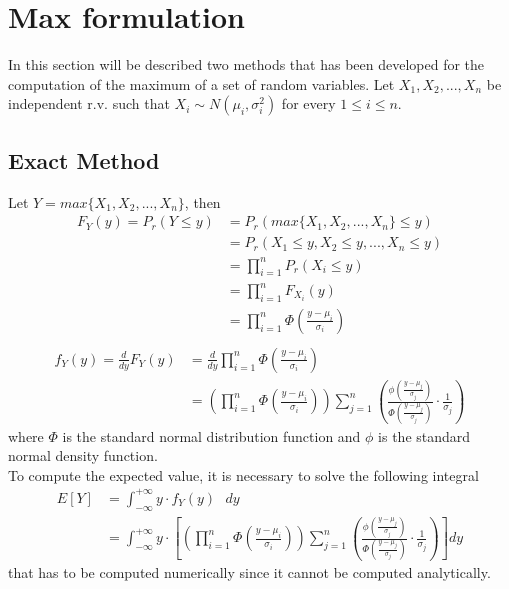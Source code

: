 \section{Max formulation}

In this section will be described two methods that has been developed for the computation of the maximum of a set of random variables.
Let $X_1, X_2, ..., X_n$ be independent r.v. such that $X_i \sim N(\mu_i, \sigma_i^2)$ for every $1 \leq i \leq n.$

\subsection{Exact Method}
Let $Y = max\{X_1, X_2, ..., X_n\}$, then
\begin{align*}
	F_Y(y) = P_r(Y \leq y) &= P_r(max\{X_1, X_2, ..., X_n\} \leq y) \\
	&= P_r(X_1 \leq y, X_2 \leq y, ..., X_n \leq y) \\
	&= \prod_{i = 1}^n P_r(X_i \leq y)  \tag*{(by indipendence of r.v)} \\
	&= \prod_{i = 1}^n F_{X_i}(y)  \\
	&= \prod_{i = 1}^n \Phi\left(\frac{y - \mu_i}{\sigma_i}\right) \\
\end{align*}
\begin{align*}
	f_Y(y) = \frac{d}{dy} F_Y(y) &= \frac{d}{dy} \prod_{i = 1}^n \Phi\left(\frac{y - \mu_i}{\sigma_i}\right) \\
	&= \left(\prod_{i = 1}^n \Phi\left(\frac{y - \mu_i}{\sigma_i}\right)\right) \sum_{j = 1}^n \left(\frac{\phi\left(\frac{y - \mu_j}{\sigma_j}\right)}{\Phi\left(\frac{y - \mu_j}{\sigma_j}\right)} \cdot \frac{1}{\sigma_j}\right)
\end{align*}
where $\Phi$ is the standard normal distribution function and $\phi$ is the standard normal density function. \\
To compute the expected value, it is necessary to solve the following integral
\begin{align*}
	E[Y] &= \int_{-\infty}^{+\infty} y \cdot f_Y(y)\text{ }dy \\
	&= \int_{-\infty}^{+\infty} y \cdot \left[\left(\prod_{i = 1}^n \Phi\left(\frac{y - \mu_i}{\sigma_i}\right)\right) \sum_{j = 1}^n \left(\frac{\phi\left(\frac{y - \mu_j}{\sigma_j}\right)}{\Phi\left(\frac{y - \mu_j}{\sigma_j}\right)} \cdot \frac{1}{\sigma_j}\right)\right]dy
\end{align*}
that has to be computed numerically since it cannot be computed analytically.

